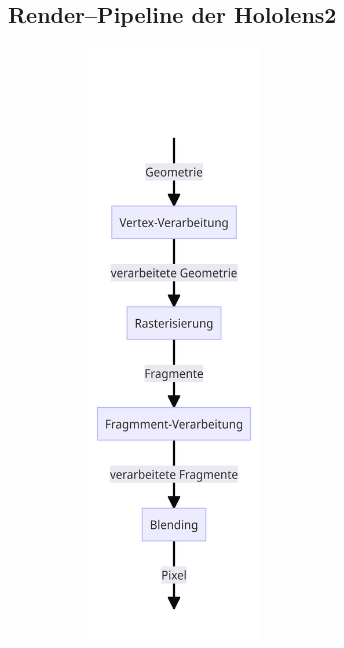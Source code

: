 \subsection{Render--Pipeline der Hololens2}\label{subsec:renderpipeline-der-hololens2}
\begin{figure}[ht!]
    \label{fig:render-pipeline}
    \begin{subfigure}{0.5\textwidth}
        \label{subfig:render-pipeline-classic}
        \centering
        \includegraphics[width=0.5\textwidth]{../assets/img/classic_render_pipline}

\end{subfigure}
\end{figure}
